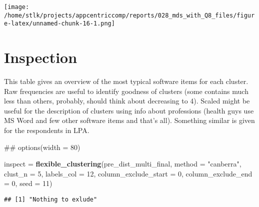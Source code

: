 \documentclass[]{article}
\newenvironment{Shaded}{\begin{snugshade}}{\end{snugshade}}
\newcommand{\KeywordTok}[1]{\textcolor[rgb]{0.13,0.29,0.53}{\textbf{{#1}}}}
\newcommand{\DataTypeTok}[1]{\textcolor[rgb]{0.13,0.29,0.53}{{#1}}}
\newcommand{\DecValTok}[1]{\textcolor[rgb]{0.00,0.00,0.81}{{#1}}}
\newcommand{\StringTok}[1]{\textcolor[rgb]{0.31,0.60,0.02}{{#1}}}
\newcommand{\NormalTok}[1]{{#1}}
\begin{document}
\texttt{[image: /home/stlk/projects/appcentriccomp/reports/028\_mds\_with\_Q8\_files/figure-latex/unnamed-chunk-16-1.png]}

\section{Inspection}\label{inspection}

This table gives an overview of the most typical software items for each
cluster. Raw frequencies are useful to identify goodness of clusters
(some contains much less than others, probably, should think about
decreasing to 4). Scaled might be useful for the description of clusters
using info about professions (health guys use MS Word and few other
software items and that's all). Something similar is given for the
respondents in LPA.

\begin{Shaded}
\begin{Highlighting}[]
\NormalTok{## options(width = 80)}

\NormalTok{inspect =}\StringTok{ }\KeywordTok{flexible_clustering}\NormalTok{(pre_dist_multi_final, }\DataTypeTok{method =} \StringTok{"canberra"}\NormalTok{, }\DataTypeTok{clust_n =} \DecValTok{5}\NormalTok{, }\DataTypeTok{labels_col =} \DecValTok{12}\NormalTok{,}
                              \DataTypeTok{column_exclude_start =} \DecValTok{0}\NormalTok{, }\DataTypeTok{column_exclude_end =} \DecValTok{0}\NormalTok{, }\DataTypeTok{seed =} \DecValTok{11}\NormalTok{)}
\end{Highlighting}
\end{Shaded}

\begin{verbatim}
## [1] "Nothing to exlude"
\end{verbatim}

\begin{Shaded}
\end{Shaded}
\end{document}
